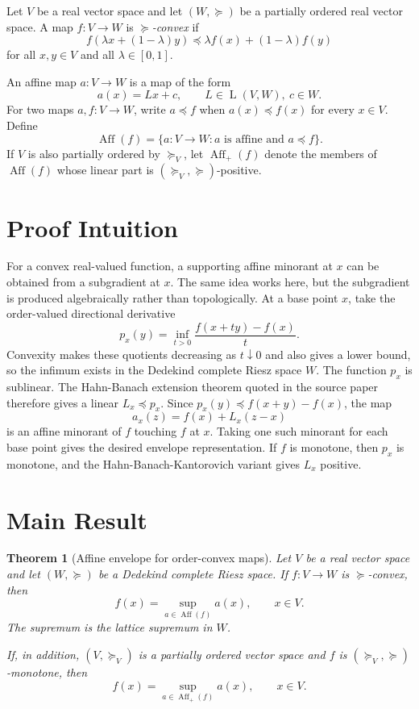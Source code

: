 \documentclass[11pt]{article}
\newtheorem{theorem}{Theorem}
\newcommand{\Aff}{\operatorname{Aff}}
\newcommand{\Lin}{\operatorname{L}}
\begin{document}
Let $V$ be a real vector space and let $(W,\succeq)$ be a partially ordered real
vector space. A map $f:V\to W$ is \emph{$\succeq$-convex} if
\[
  f(\lambda x+(1-\lambda)y)
  \preceq \lambda f(x)+(1-\lambda)f(y)
\]
for all $x,y\in V$ and all $\lambda\in[0,1]$.

An affine map $a:V\to W$ is a map of the form
\[
  a(x)=Lx+c,\qquad L\in \Lin(V,W),\ c\in W.
\]
For two maps $a,f:V\to W$, write $a\preceq f$ when $a(x)\preceq f(x)$ for every
$x\in V$. Define
\[
  \Aff(f)=\{a:V\to W: a \text{ is affine and } a\preceq f\}.
\]
If $V$ is also partially ordered by $\succeq_V$, let $\Aff_+(f)$ denote the
members of $\Aff(f)$ whose linear part is
$(\succeq_V,\succeq)$-positive.

\section*{Proof Intuition}

For a convex real-valued function, a supporting affine minorant at $x$ can be
obtained from a subgradient at $x$. The same idea works here, but the
subgradient is produced algebraically rather than topologically. At a base
point $x$, take the order-valued directional derivative
\[
  p_x(y)=\inf_{t>0}\frac{f(x+ty)-f(x)}{t}.
\]
Convexity makes these quotients decreasing as $t\downarrow0$ and also gives a
lower bound, so the infimum exists in the Dedekind complete Riesz space $W$.
The function $p_x$ is sublinear. The Hahn-Banach extension theorem quoted in
the source paper therefore gives a linear $L_x\preceq p_x$. Since
$p_x(y)\preceq f(x+y)-f(x)$, the map
\[
  a_x(z)=f(x)+L_x(z-x)
\]
is an affine minorant of $f$ touching $f$ at $x$. Taking one such minorant for
each base point gives the desired envelope representation. If $f$ is monotone,
then $p_x$ is monotone, and the Hahn-Banach-Kantorovich variant gives $L_x$
positive.

\section*{Main Result}

\begin{theorem}[Affine envelope for order-convex maps]\label{thm:main}
Let $V$ be a real vector space and let $(W,\succeq)$ be a Dedekind complete
Riesz space. If $f:V\to W$ is $\succeq$-convex, then
\[
  f(x)=\sup_{a\in\Aff(f)} a(x),\qquad x\in V.
\]
The supremum is the lattice supremum in $W$.

If, in addition, $(V,\succeq_V)$ is a partially ordered vector space and $f$ is
$(\succeq_V,\succeq)$-monotone, then
\[
  f(x)=\sup_{a\in\Aff_+(f)} a(x),\qquad x\in V.
\]
\end{theorem}
\end{document}
